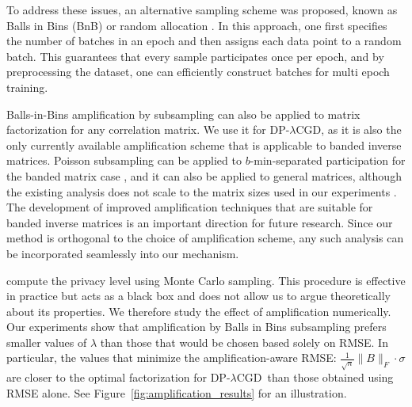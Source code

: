 \documentclass{article}
\theoremstyle{plain}
\theoremstyle{definition}
\theoremstyle{remark}
\newcommand{\method}{DP-$\lambda$CGD\xspace}
\begin{document}
To address these issues, an alternative sampling scheme was proposed, known as Balls in Bins (BnB) \citep{chua2024balls, choquette2024near} or random allocation \citep{feldman2025privacy}. In this approach, one first specifies the number of batches in an epoch and then assigns each data point to a random batch. This guarantees that every sample participates once per epoch, and by preprocessing the dataset, one can efficiently construct batches for multi epoch training. 

Balls-in-Bins amplification by subsampling can also be applied to matrix factorization \citep{choquette2024near} for any correlation matrix. We use it for \method, as it is also the only currently available amplification scheme that is applicable to banded inverse matrices. Poisson subsampling can be applied to $b$-min-separated participation for the banded matrix case \citep{choquette2023amplified}, and it can also be applied to general matrices, although the existing analysis does not scale to the matrix sizes used in our experiments \citep{choquette2023privacy}. The development of improved amplification techniques that are suitable for banded inverse matrices is an important direction for future research. Since our method is orthogonal to the choice of amplification scheme, any such analysis can be incorporated seamlessly into our mechanism.
 

\citet{choquette2024near} compute the privacy level using Monte Carlo sampling. This procedure is effective in practice but acts as a black box and does not allow us to argue theoretically about its properties. We therefore study the effect of amplification numerically. Our experiments show that amplification by Balls in Bins subsampling prefers smaller values of $\lambda$ than those that would be chosen based solely on RMSE. In particular, the values that minimize the amplification-aware RMSE: $\tfrac{1}{\sqrt{n}}\|B\|_F \cdot \sigma$ are closer to the optimal factorization for \method\ than those obtained using RMSE alone. See Figure~\ref{fig:amplification_results} for an illustration.
\end{document}
